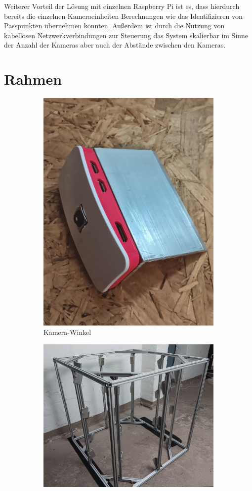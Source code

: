 \documentclass[./00PhotoBox.tex]{subfiles}
\begin{document}
Weiterer Vorteil der Lösung mit einzelnen Raspberry Pi ist es, dass hierdurch bereits die einzelnen Kameraeinheiten Berechnungen wie das Identifizieren von Passpunkten übernehmen könnten. Außerdem ist durch die Nutzung von kabellosen Netzwerkverbindungen zur Steuerung das System skalierbar im Sinne der Anzahl der Kameras aber auch der Abstände zwischen den Kameras.

\section{Rahmen}

\begin{figure}
    \centering
    \begin{subfigure}{0.45\textwidth}
        \includegraphics[height=0.9\linewidth]{./img/aluwinkel.jpg}
        \centering
        \caption{Kamera-Winkel} %
        \label{img:aluwinkel} %
    \end{subfigure}
    \begin{subfigure}{0.45\textwidth}
        \includegraphics[height=0.8\linewidth]{./img/alurahmen.jpg}

\end{subfigure}
\end{figure}
\end{document}
